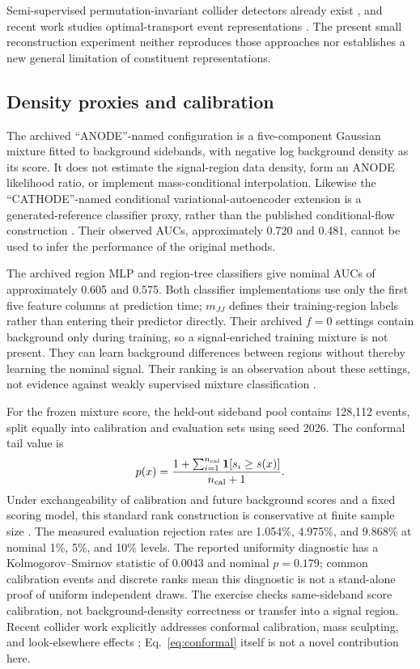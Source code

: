 \documentclass[reprint,aps,pra,amsmath,amssymb,floatfix,raggedbottom]{revtex4-2}
\newcommand{\mjj}{m_{JJ}}
\begin{document}
Semi-supervised permutation-invariant collider detectors already exist \cite{antelope}, and recent work studies optimal-transport event representations \cite{ot}. The present small reconstruction experiment neither reproduces those approaches nor establishes a new general limitation of constituent representations.

\subsection{Density proxies and calibration}
The archived ``ANODE''-named configuration is a five-component Gaussian mixture fitted to background sidebands, with negative log background density as its score. It does not estimate the signal-region data density, form an ANODE likelihood ratio, or implement mass-conditional interpolation. Likewise the ``CATHODE''-named conditional variational-autoencoder extension is a generated-reference classifier proxy, rather than the published conditional-flow construction \cite{anode,cathode}. Their observed AUCs, approximately 0.720 and 0.481, cannot be used to infer the performance of the original methods.

The archived region MLP and region-tree classifiers give nominal AUCs of approximately 0.605 and 0.575. Both classifier implementations use only the first five feature columns at prediction time; $\mjj$ defines their training-region labels rather than entering their predictor directly. Their archived $f=0$ settings contain background only during training, so a signal-enriched training mixture is not present. They can learn background differences between regions without thereby learning the nominal signal. Their ranking is an observation about these settings, not evidence against weakly supervised mixture classification \cite{cwola}.

For the frozen mixture score, the held-out sideband pool contains 128,112 events, split equally into calibration and evaluation sets using seed 2026. The conformal tail value is
\begin{equation}\label{eq:conformal}
 p(x)={1+\sum_{i=1}^{n_{\mathrm{cal}}}\mathbf1[s_i\geq s(x)]\over n_{\mathrm{cal}}+1}.
\end{equation}
Under exchangeability of calibration and future background scores and a fixed scoring model, this standard rank construction is conservative at finite sample size \cite{conformal}. The measured evaluation rejection rates are 1.054\%, 4.975\%, and 9.868\% at nominal 1\%, 5\%, and 10\% levels. The reported uniformity diagnostic has a Kolmogorov--Smirnov statistic of 0.0043 and nominal $p=0.179$; common calibration events and discrete ranks mean this diagnostic is not a stand-alone proof of uniform independent draws. The exercise checks same-sideband score calibration, not background-density correctness or transfer into a signal region. Recent collider work explicitly addresses conformal calibration, mass sculpting, and look-elsewhere effects \cite{araz}; Eq.~\eqref{eq:conformal} itself is not a novel contribution here.
\end{document}
